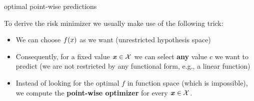 \begin{frame}[t]{optimal point-wise predictions}  

To derive the risk minimizer we usually make use of the following trick: 

\begin{itemize}
	\item We can choose $f(x)$ as we want (unrestricted hypothesis space)
	\item Consequently, for a fixed value $\bm{x} \in \mathcal{X}$ we can select \textbf{any} value $c$ we want to predict (we are not restricted by any functional form, e.g., a linear function)
	\item Instead of looking for the optimal $f$ in function space (which is impossible), we compute the \textbf{point-wise optimizer} for every $\bm{x} \in \mathcal{X}$.
\end{itemize}

\begin{overlayarea}{\textwidth}{\textheight}
\begin{center}
\end{center}
\end{overlayarea} 


\end{frame}


